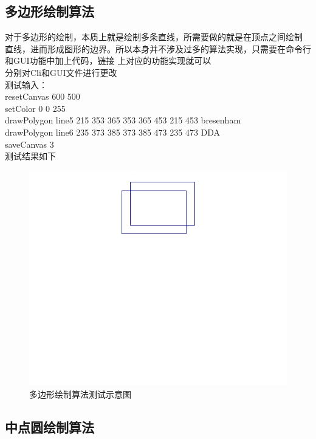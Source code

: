 \documentclass[a4paper,UTF8]{article}
\theoremstyle{definition}
\begin{document}
\subsection{多边形绘制算法}
对于多边形的绘制，本质上就是绘制多条直线，所需要做的就是在顶点之间绘制
直线，进而形成图形的边界。所以本身并不涉及过多的算法实现，只需要在命令行和GUI功能中加上代码，链接
上对应的功能实现就可以\\
分别对Cli和GUI文件进行更改\\

测试输入：\\
\indent resetCanvas 600 500\\
\indent setColor 0 0 255\\
\indent drawPolygon line5 215 353 365 353 365 453 215 453 bresenham\\
\indent drawPolygon line6 235 373 385 373 385 473 235 473 DDA\\
\indent saveCanvas 3\\

测试结果如下\\
\begin{figure}[h]
	\centering
	\includegraphics[scale=0.6]{figure/polytest.png}
	\caption{多边形绘制算法测试示意图}
	\label{fig:Poly}
\end{figure}

\subsection{中点圆绘制算法}
\end{document}
